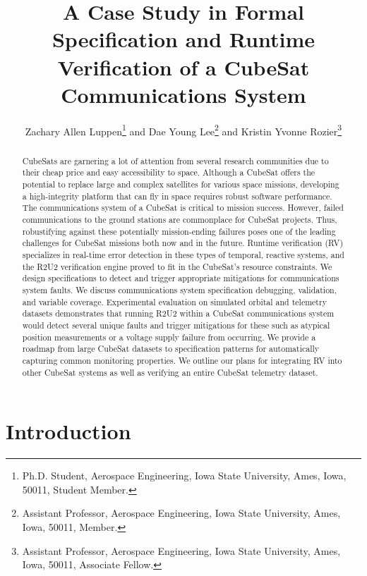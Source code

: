 \documentclass[conf]{new-aiaa}
\title{A Case Study in Formal Specification and Runtime Verification of a CubeSat Communications System}
\author{Zachary Allen Luppen\footnote{Ph.D. Student, Aerospace Engineering, Iowa State University, Ames, Iowa, 50011, Student Member.} and Dae Young Lee\footnote{Assistant Professor, Aerospace Engineering, Iowa State University, Ames, Iowa, 50011, Member.} and Kristin Yvonne Rozier\footnote{Assistant Professor, Aerospace Engineering, Iowa State University, Ames, Iowa, 50011, Associate Fellow.}}
\affil{Iowa State University, \{zaluppen,kyrozier,daylee\}@iastate.edu}
\begin{document}
\maketitle

\begin{abstract}

CubeSats are garnering a lot of attention from several research communities due to their cheap price and easy accessibility to space. Although a CubeSat offers the potential to replace large and complex satellites for various space missions, developing a high-integrity platform that can fly in space requires robust software performance. The communications system of a CubeSat %
is critical to mission success. However, failed communications to the ground stations are commonplace for CubeSat projects. Thus, robustifying against these potentially mission-ending failures poses one of the leading challenges for CubeSat missions both now and in the future. %
Runtime verification (RV) specializes in real-time error detection in these types of temporal, reactive systems, and the R2U2 verification engine proved to fit in the CubeSat's resource constraints. We design specifications to detect and trigger appropriate mitigations for communications system faults. We discuss communications system specification debugging, validation, and variable coverage. Experimental evaluation on simulated orbital and telemetry datasets demonstrates that running R2U2 within a CubeSat communications system would detect several unique faults and trigger mitigations for these such as atypical position measurements or a voltage supply failure from occurring. We provide a roadmap from large CubeSat datasets to specification patterns for automatically capturing common monitoring properties. We outline our plans for integrating RV into other CubeSat systems as well as verifying an entire CubeSat telemetry dataset.

\end{abstract}


\section{Introduction}
\end{document}
